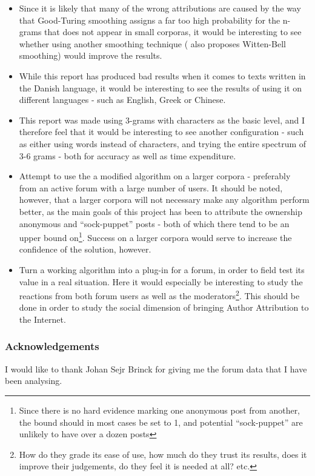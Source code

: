 \begin{itemize}
\item Since it is likely that many of the wrong attributions are caused by the way that Good-Turing smoothing assigns a far too high probability for the n-grams that does not appear in small corporas, it would be interesting to see whether using another smoothing technique (\cite{nr4} also proposes Witten-Bell smoothing) would improve the results.

\item While this report has produced bad results when it comes to texts written in the Danish language, it would be interesting to see the results of using it on different languages - such as English, Greek or Chinese.

\item This report was made using 3-grams with characters as the basic level, and I therefore feel that it would be interesting to see another configuration - such as either using words instead of characters, and trying the entire spectrum of 3-6 grams - both for accuracy as well as time expenditure. 

\item Attempt to use the a modified algorithm on a larger corpora - preferably from an active forum with a large number of users. It should be noted, however, that a larger corpora will not necessary make any algorithm perform better, as the main goals of this project has been to attribute the ownership anonymous and ``sock-puppet'' posts - both of which there tend to be an upper bound on\footnote{Since there is no hard evidence marking one anonymous post from another, the bound should in most cases be set to 1, and potential ``sock-puppet'' are unlikely to have over a dozen posts}. Success on a larger corpora would serve to increase the confidence of the solution, however. 

\item Turn a working algorithm into a plug-in for a forum, in order to field test its value in a real situation. Here it would especially be interesting to study the reactions from both forum users as well as the moderators\footnote{How do they grade its ease of use, how much do they trust its results, does it improve their judgements, do they feel it is needed at all? etc.}. This should be done in order to study the social dimension of bringing Author Attribution to the Internet.
\end{itemize}  

\subsubsection*{Acknowledgements}
I would like to thank Johan Sejr Brinck for giving me the forum data that I have been analysing.
